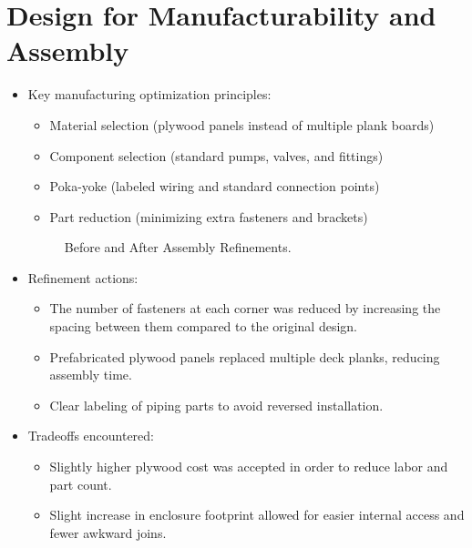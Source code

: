 \documentclass[12pt]{report}
\begin{document}
\section{Design for Manufacturability and Assembly}
\begin{itemize}[leftmargin=1.5cm]
    \item Key manufacturing optimization principles:
    \begin{itemize}
        \item Material selection (plywood panels instead of multiple plank boards)
        \item Component selection (standard pumps, valves, and fittings)
        \item Poka-yoke (labeled wiring and standard connection points)
        \item Part reduction (minimizing extra fasteners and brackets)
    \end{itemize}
    \begin{figure}[h!]
        \centering
        \caption{Before and After Assembly Refinements.}
        \label{fig:before_after}
    \end{figure}
    \item Refinement actions:
    \begin{itemize}
        \item The number of fasteners at each corner was reduced by increasing the spacing between them compared to the original design.
        \item Prefabricated plywood panels replaced multiple deck planks, reducing assembly time.
        \item Clear labeling of piping parts to avoid reversed installation.
    \end{itemize}
    \item Tradeoffs encountered:
    \begin{itemize}
        \item Slightly higher plywood cost was accepted in order to reduce labor and part count.
        \item Slight increase in enclosure footprint allowed for easier internal access and fewer awkward joins.
    \end{itemize}
\end{itemize}

\end{document}
